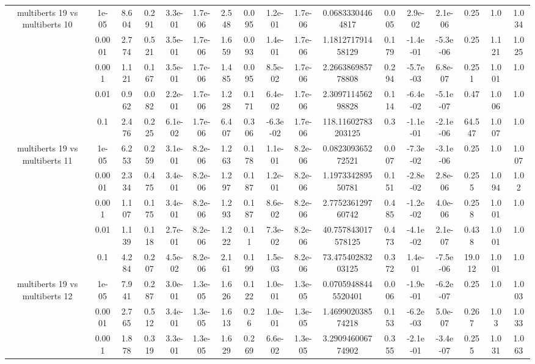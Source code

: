 \begin{tabular}{|c|c|c|c|c|c|c|c|c|c|c|c|c|c|c|c|c|}
\hline
\multirow{5}{*}{multiberts 19 vs multiberts 10} & 1e-05 & 8.604 & 0.291 & 3.3e-01 & 1.7e-06 & 2.548 & 0.095 & 1.2e-01 & 1.7e-06 & 0.06833304464817 & 0.005 & 2.9e-02 & 2.1e-06 & 0.25 & 1.0 & 1.034 \\
 & 0.0001 & 2.774 & 0.521 & 3.5e-01 & 1.7e-06 & 1.659 & 0.093 & 1.4e-01 & 1.7e-06 & 1.181271791458129 & 0.179 & -1.4e-01 & -5.3e-06 & 0.25 & 1.121 & 1.025 \\
 & 0.001 & 1.121 & 0.167 & 3.5e-01 & 1.7e-06 & 1.485 & 0.095 & 8.5e-02 & 1.7e-06 & 2.266386985778808 & 0.294 & -5.7e-03 & 6.8e-07 & 0.251 & 1.001 & 1.0 \\
 & 0.01 & 0.962 & 0.082 & 2.2e-01 & 1.7e-06 & 1.228 & 0.171 & 6.4e-02 & 1.7e-06 & 2.309711456298828 & 0.114 & -6.4e-02 & -5.1e-07 & 0.47 & 1.006 & 1.0 \\
 & 0.1 & 2.476 & 0.225 & 6.1e-02 & 1.7e-06 & 6.407 & 0.306 & -6.3e-02 & 1.7e-06 & 118.11602783203125 & 0.3 & -1.1e-01 & -2.1e-06 & 64.547 & 1.007 & 1.0 \\
\hline
\multirow{5}{*}{multiberts 19 vs multiberts 11} & 1e-05 & 6.253 & 0.259 & 3.1e-01 & 8.2e-06 & 1.263 & 0.178 & 1.1e-01 & 8.2e-06 & 0.082309365272521 & 0.007 & -7.3e-02 & -3.1e-06 & 0.25 & 1.0 & 1.007 \\
 & 0.0001 & 2.334 & 0.475 & 3.4e-01 & 8.2e-06 & 1.297 & 0.187 & 1.2e-01 & 8.2e-06 & 1.197334289550781 & 0.151 & -2.8e-02 & 2.8e-06 & 0.255 & 1.094 & 1.02 \\
 & 0.001 & 1.107 & 0.175 & 3.4e-01 & 8.2e-06 & 1.293 & 0.187 & 8.6e-02 & 8.2e-06 & 2.775236129760742 & 0.485 & -1.2e-02 & 4.0e-06 & 0.258 & 1.001 & 1.0 \\
 & 0.01 & 1.139 & 0.118 & 2.7e-01 & 8.2e-06 & 1.222 & 0.11 & 7.3e-02 & 8.2e-06 & 40.757843017578125 & 0.473 & -4.1e-02 & 2.1e-07 & 0.438 & 1.001 & 1.0 \\
 & 0.1 & 4.284 & 0.207 & 4.5e-02 & 8.2e-06 & 2.161 & 0.199 & 1.5e-03 & 8.2e-06 & 73.47540283203125 & 0.372 & 1.4e-01 & -7.5e-06 & 19.012 & 1.001 & 1.0 \\
\hline
\multirow{5}{*}{multiberts 19 vs multiberts 12} & 1e-05 & 7.941 & 0.287 & 3.0e-01 & 1.3e-05 & 1.626 & 0.122 & 1.0e-01 & 1.3e-05 & 0.07059488445520401 & 0.006 & -1.9e-01 & -6.2e-07 & 0.25 & 1.0 & 1.003 \\
 & 0.0001 & 2.765 & 0.512 & 3.4e-01 & 1.3e-05 & 1.613 & 0.26 & 1.0e-01 & 1.3e-05 & 1.469902038574218 & 0.153 & -6.2e-03 & 5.0e-07 & 0.267 & 1.03 & 1.033 \\
 & 0.001 & 1.878 & 0.319 & 3.3e-01 & 1.3e-05 & 1.629 & 0.269 & 6.6e-02 & 1.3e-05 & 3.290946006774902 & 0.355 & -2.1e-01 & -3.4e-07 & 0.255 & 1.031 & 1.063 \\

\end{tabular}
